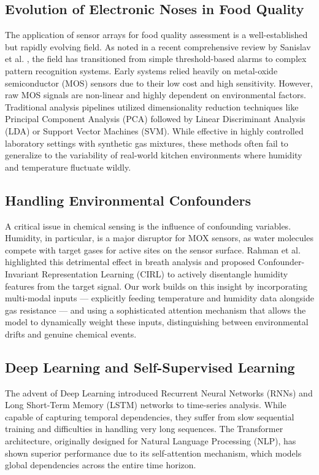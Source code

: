 \documentclass[conference]{IEEEtran}
\begin{document}
    \subsection{Evolution of Electronic Noses in Food Quality}
    The application of sensor arrays for food quality assessment is a well-established but rapidly evolving field. As noted in a recent comprehensive review by Sanislav et al. \cite{sanislav2025review}, the field has transitioned from simple threshold-based alarms to complex pattern recognition systems. Early systems relied heavily on metal-oxide semiconductor (MOS) sensors due to their low cost and high sensitivity. However, raw MOS signals are non-linear and highly dependent on environmental factors. Traditional analysis pipelines utilized dimensionality reduction techniques like Principal Component Analysis (PCA) followed by Linear Discriminant Analysis (LDA) or Support Vector Machines (SVM). While effective in highly controlled laboratory settings with synthetic gas mixtures, these methods often fail to generalize to the variability of real-world kitchen environments where humidity and temperature fluctuate wildly.

    \subsection{Handling Environmental Confounders}
    A critical issue in chemical sensing is the influence of confounding variables. Humidity, in particular, is a major disruptor for MOX sensors, as water molecules compete with target gases for active sites on the sensor surface. Rahman et al. \cite{rahman2025cirl} highlighted this detrimental effect in breath analysis and proposed Confounder-Invariant Representation Learning (CIRL) to actively disentangle humidity features from the target signal. Our work builds on this insight by incorporating multi-modal inputs — explicitly feeding temperature and humidity data alongside gas resistance — and using a sophisticated attention mechanism that allows the model to dynamically weight these inputs, distinguishing between environmental drifts and genuine chemical events.

    \subsection{Deep Learning and Self-Supervised Learning}
    The advent of Deep Learning introduced Recurrent Neural Networks (RNNs) and Long Short-Term Memory (LSTM) networks to time-series analysis. While capable of capturing temporal dependencies, they suffer from slow sequential training and difficulties in handling very long sequences. The Transformer architecture, originally designed for Natural Language Processing (NLP), has shown superior performance due to its self-attention mechanism, which models global dependencies across the entire time horizon.
\end{document}
